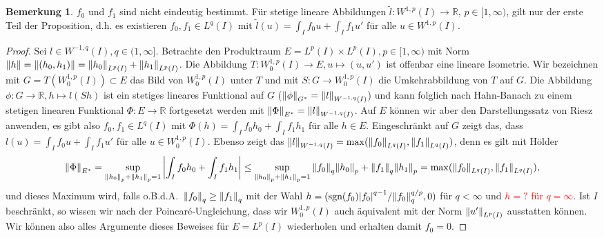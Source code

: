 \documentclass[twoside]{article}
\theoremstyle{definition}
\newtheorem{remark}[theorem]{Bemerkung}
\begin{document}
\begin{remark}
$f_0$ und $f_1$ sind nicht eindeutig bestimmt. Für stetige lineare Abbildungen $\tilde{l}: W^{1,p}(I) \to \mathbb{R}$, $p \in [1,\infty)$, gilt nur der erste Teil der Proposition, d.h. es existieren $f_0,f_1 \in L^{q}(I)$ mit $\tilde{l}(u)=\int_I f_0 u  + \int_I f_1 u'$ für alle $ u \in W^{1,p}(I)$.
\end{remark}
\begin{proof}
Sei $l \in W^{-1,q}(I), q \in (1,\infty]$. Betrachte den Produktraum $E = L^p(I) \times L^p(I), p \in [1,\infty)$ mit Norm $\norm{h}=\norm{(h_0,h_1)}= \norm{h_0}_{L^p(I)} +\norm{h_1}_{L^p(I)}$. Die Abbildung $T: W_0^{1,p}(I) \to E, u \mapsto (u,u')$ ist offenbar eine lineare Isometrie. Wir bezeichnen mit $G = T(W_0^{1,p}(I)) \subset E$ das Bild von $W_0^{1,p}(I)$ unter $T$ und mit $S:G \to W_0^{1,p}(I)$ die Umkehrabbildung von $T$ auf $G$. Die Abbildung $\phi:G \to \mathbb{R}, h \mapsto l(Sh)$ ist ein stetiges lineares Funktional auf $G$ ($\norm{\phi}_{G^*}=\norm{l}_{W^{-1,q}(I)}$) und kann folglich nach Hahn-Banach zu einem stetigen linearen Funktional $\Phi:E \to \mathbb{R}$ fortgesetzt werden mit $\norm{\Phi}_{E^*}=\norm{l}_{W^{-1,q}(I)}$. Auf $E$ können wir aber den Darstellungssatz von Riesz anwenden, es gibt also $f_0, f_1 \in L^q(I)$ mit $\Phi(h)=\int_If_0h_0 + \int_If_1h_1$ für alle $h \in E$. Eingeschränkt auf $G$ zeigt das, dass $l(u) = \int_I f_0 u  + \int_I f_1 u'$ für alle $u \in W^{1,p}_0(I)$. Ebenso zeigt das $\norm{l}_{ W^{-1,q}(I)}=\max(\norm{f_0}_{L^q(I)},\norm{f_1}_{L^q(I)})$, denn es gilt mit Hölder
\begin{align*}
\norm{\Phi}_{E^*}= \sup_{\norm{h_0}_p + \norm{h_1}_p = 1} \abs{\int_If_0h_0 + \int_If_1h_1} \leq \sup_{\norm{h_0}_p + \norm{h_1}_p = 1} \norm{f_0}_q \norm{h_0}_p + \norm{f_1}_q \norm{h_1}_p = \max(\norm{f_0}_{L^q(I)},\norm{f_1}_{L^q(I)}),
\end{align*}
und dieses Maximum wird, falls o.B.d.A.\ $\norm{f_0}_q \geq \norm{f_1}_q$ mit der Wahl $h = (\text{sgn}(f_0) \abs{f_0}^{q-1}/\norm{f_0}_q^{q/p},0)$ für $q < \infty$ und \textcolor{red}{$h = ?$ für $q = \infty$}. Ist $I$ beschränkt, so wissen wir nach der Poincar{\'e}-Ungleichung, dass wir $W^{1,p}_0(I)$ auch äquivalent mit der Norm $\norm{u'}_{L^p(I)}$ ausstatten können. Wir können also alles Argumente dieses Beweises für $E =  L^p(I)$ wiederholen und erhalten damit $f_0=0$.
\end{proof}
\end{document}
